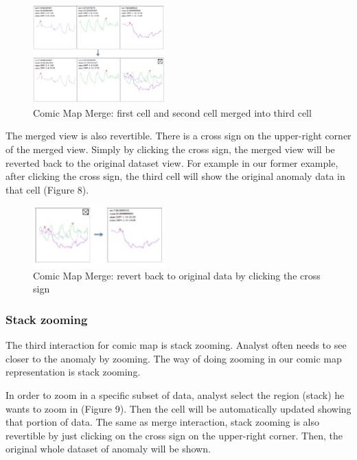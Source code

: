 \documentclass{vgtc}                          %
\begin{document}
 \begin{figure}[htb]
	\centering
  \includegraphics[width=0.45\textwidth]{merge.jpg}
  \caption{Comic Map Merge: first cell and second cell merged into third cell}
\end{figure}
 
The merged view is also revertible. There is a cross sign on the upper-right corner of the merged view. Simply by clicking the cross sign, the merged view will be reverted back to the original dataset view. For example in our former example, after clicking the cross sign, the third cell will show the original anomaly data in that cell (Figure 8).

 \begin{figure}[htb]
	\centering
  \includegraphics[width=0.45\textwidth]{merge2.jpg}
  \caption{Comic Map Merge: revert back to original data by clicking the cross sign}
\end{figure}

\subsubsection{Stack zooming}
The third interaction for comic map is stack zooming. Analyst often needs to see closer to the anomaly by zooming. The way of doing zooming in our comic map representation is stack zooming.

In order to zoom in a specific subset of data, analyst select the region (stack) he wants to zoom in (Figure 9). Then the cell will be automatically updated showing that portion of data. 
The same as merge interaction, stack zooming is also revertible by just clicking on the cross sign on the upper-right corner. Then, the original whole dataset of anomaly will be shown.
\end{document}

